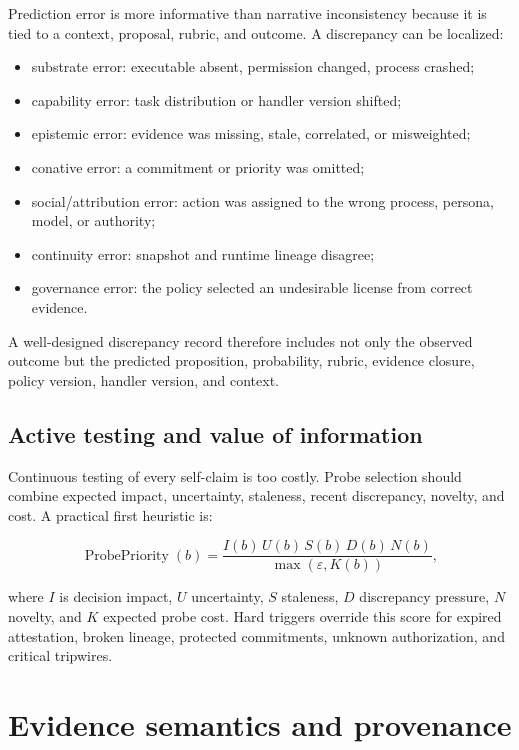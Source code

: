 \documentclass[11pt,oneside]{report}
\begin{document}
Prediction error is more informative than narrative inconsistency because it is tied to a context, proposal, rubric, and outcome. A discrepancy can be localized:

\begin{itemize}
  \item substrate error: executable absent, permission changed, process crashed;
  \item capability error: task distribution or handler version shifted;
  \item epistemic error: evidence was missing, stale, correlated, or misweighted;
  \item conative error: a commitment or priority was omitted;
  \item social/attribution error: action was assigned to the wrong process, persona, model, or authority;
  \item continuity error: snapshot and runtime lineage disagree;
  \item governance error: the policy selected an undesirable license from correct evidence.
\end{itemize}

A well-designed discrepancy record therefore includes not only the observed outcome but the predicted proposition, probability, rubric, evidence closure, policy version, handler version, and context.

\section{Active testing and value of information}

Continuous testing of every self-claim is too costly. Probe selection should combine expected impact, uncertainty, staleness, recent discrepancy, novelty, and cost. A practical first heuristic is:

\[
\operatorname{ProbePriority}(b)=
\frac{I(b)\,U(b)\,S(b)\,D(b)\,N(b)}{\max(\varepsilon,K(b))},
\]

where $I$ is decision impact, $U$ uncertainty, $S$ staleness, $D$ discrepancy pressure, $N$ novelty, and $K$ expected probe cost. Hard triggers override this score for expired attestation, broken lineage, protected commitments, unknown authorization, and critical tripwires.

\chapter{Evidence semantics and provenance}
\end{document}
